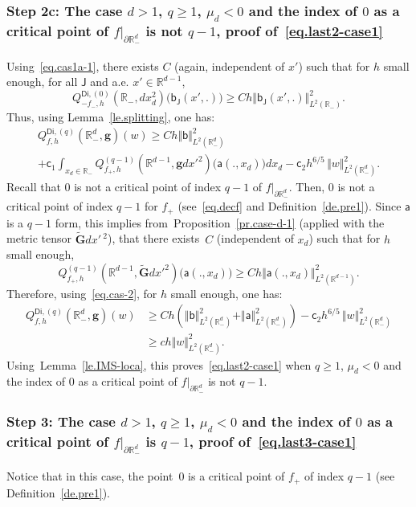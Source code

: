\documentclass[JEP,XML,SOM,Unicode,NoEqCountersInSection,NoFloatCountersInSection,published]{cedram}
\newcommand{\mbf}[1]{\mathbf{#1}}
\let\pa\partial
\theoremstyle{plain}
\theoremstyle{definition}
\begin{document}
\subsubsection*{Step 2c: The case $d>1$, $q \ge 1$, $\mu_{d}<0$ and the index
of $0$ as a critical point of $f|_{\pa \mathbb R^{d}_-}$ is not $q-1$, proof of~\eqref{eq.last2-case1}}
Using~\eqref{eq.cas1a-1}, there exists $C$ (again, independent of $x'$) such that for $h$ small enough, for all $\mathsf J$ and a.e. $x'\in \mathbb R^{d-1}$,
\begin{equation}\label{cas-lambda<0}
Q^{\mathsf{Di},(0)}_{-f_-,h}(\mathbb R_-,dx_d^2)\bigl(\mathsf b_{\mathsf J}(x',.)\bigr) \ge Ch \Vert \mathsf b_{\mathsf J}(x',.) \Vert_{L^2(\mathbb R_-)}^2.
\end{equation}
Thus, using Lemma~\ref{le.splitting}, one has:
\begin{multline}\label{eq.cas-2}
Q^{\mathsf{Di},(q)}_{f,h}(\mathbb R_-^d, \mbf g)(w)\ge Ch \Vert \mathsf b \Vert_{L^2(\mathbb R^d_-)}^2\\
+\mathsf c_1\int_{x_d\in \mathbb R_- } Q^{(q-1)}_{f_+,h}(\mathbb R^{d-1}, \mbf gdx'^2)\bigl(\mathsf a(.,x_d)\bigr) dx_d
-\mathsf c_2h^{6/5}\, \Vert w \Vert_{L^2(\mathbb R^d_-)}^2.
\end{multline}
Recall that $0$ is not a critical point of index $q-1$ of $f|_{\pa \mathbb R^{d}_-}$. Then, $0$ is not a critical point of index $q-1$ for $f_+$ (see~\eqref{eq.decf} and Definition~\ref{de.pre1}). Since $\mathsf a$ is a $q-1$ form, this implies from~Proposition~\ref{pr.case-d-1} (applied with the metric tensor $ \tilde {\mbf G}dx'\,^2$), that there exists~$C$ (independent of $x_d$) such that for $h$ small enough,
\[
Q^{(q-1)}_{f_+,h}(\mathbb R^{d-1}, \tilde {\mbf G}dx'^2)\bigl(\mathsf a(.,x_d)\bigr) \ge Ch \Vert \mathsf a(.,x_d) \Vert_{L^2(\mathbb R^{d-1})}^2.
\]
Therefore, using~\eqref{eq.cas-2}, for $h$ small enough, one has:
\[
\begin{aligned}
Q^{\mathsf{Di},(q)}_{f,h}(\mathbb R^{d}_-, \mbf g)(w)&\ge Ch(\Vert
\mathsf b \Vert_{L^2(\mathbb R^d_-)}^2+ \Vert \mathsf a
\Vert_{L^2(\mathbb R^{d}_-)}^2)-\mathsf c_2h^{6/5}\, \Vert w
\Vert_{L^2(\mathbb R^d_-)}^2 \\
&\ge ch \Vert w \Vert_{L^2(\mathbb R^d_-)}^2.
\end{aligned}
\]
Using~Lemma~\ref{le.IMS-loca}, this proves~\eqref{eq.last2-case1} when
$q\ge 1$, $\mu_{d}<0$ and the index of $0$ as a critical point of
$f|_{\pa \mathbb R^{d}_-}$ is not $q-1$.

\subsubsection*{Step 3: The case $d>1$, $q \ge 1$, $\mu_{d}<0$ and the index
of $0$ as a critical point of $f|_{\pa \mathbb R^{d}_-}$ is $q-1$, proof of~\eqref{eq.last3-case1}}
Notice that in this case, the point~$0$ is a critical point of $f_+$ of index $q-1$ (see Definition~\ref{de.pre1}).
\end{document}

